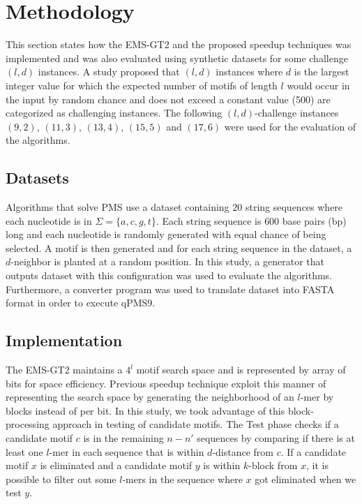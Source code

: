 \section{Methodology}
This section states how the EMS-GT2 and the proposed speedup techniques was implemented and was also evaluated using synthetic datasets for some challenge $(l, d)$ instances. A study \cite{pms2015} proposed that $(l, d)$ instances where $d$ is the largest integer value for which the expected number of motifs of length $l$ would occur in the input by random chance and does not exceed a constant value (500) are categorized as challenging instances. The following $(l, d)$-challenge instances $(9, 2)$, $(11, 3)$, $(13, 4)$, $(15, 5)$ and $(17, 6)$ were used for the evaluation of the algorithms.

\subsection{Datasets}
Algorithms that solve PMS \cite{pevzner2000combinatorial, pms2014, pms2015} use a dataset containing $20$ string sequences where each nucleotide is in $\Sigma = \{a, c, g, t\}$. Each string sequence is $600$ base pairs (bp) long and each nucleotide is randomly generated with equal chance of being selected. A motif is then generated and for each string sequence in the dataset, a $d$-neighbor is planted at a random position. In this study, a generator that outputs dataset with this configuration was used to evaluate the algorithms. Furthermore, a converter program was used to translate dataset into FASTA format in order to execute qPMS9.


\subsection{Implementation}
The EMS-GT2 maintains a $4^l$ motif search space and is represented by array of bits for space efficiency. Previous speedup technique exploit this manner of representing the search space by generating the neighborhood of an $l$-mer by blocks instead of per bit. In this study, we took advantage of this block-processing approach in testing of candidate motifs. The Test phase checks if a candidate motif $c$ is in the remaining $n - n'$ sequences by comparing if there is at least one $l$-mer in each sequence that is within $d$-distance from $c$. If a candidate motif $x$ is eliminated and a candidate motif $y$ is within $k$-block from $x$, it is possible to filter out some $l$-mers in the sequence where $x$ got eliminated when we test $y$.

